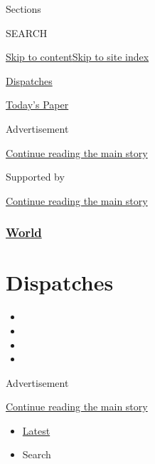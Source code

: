 Sections

SEARCH

\protect\hyperlink{site-content}{Skip to
content}\protect\hyperlink{site-index}{Skip to site index}

\href{https://www.nytimes.com/spotlight/dispatches-international}{Dispatches}

\href{https://myaccount.nytimes.com/auth/login?response_type=cookie\&client_id=vi}{}

\href{https://www.nytimes.com/section/todayspaper}{Today's Paper}

Advertisement

\protect\hyperlink{after-top}{Continue reading the main story}

Supported by

\protect\hyperlink{after-sponsor}{Continue reading the main story}

\hypertarget{world}{%
\subsubsection{\texorpdfstring{\href{/section/world}{World}}{World}}\label{world}}

\hypertarget{dispatches}{%
\section{Dispatches}\label{dispatches}}

\begin{itemize}
\item
\item
\item
\item
\end{itemize}

Advertisement

\protect\hyperlink{after-subheader}{Continue reading the main story}

\begin{itemize}
\tightlist
\item
  \protect\hyperlink{stream-panel}{Latest}
\item
  Search
\end{itemize}

